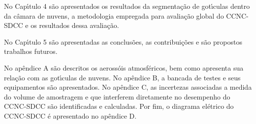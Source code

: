 No Cap\'{\i}tulo 4 s\~{a}o apresentados os resultados da segmenta\c{c}\~{a}o de got\'{\i}culas dentro da c\^{a}mara de nuvens, a metodologia empregada para avalia\c{c}\~{a}o global do CCNC-SDCC e os resultados dessa avalia\c{c}\~{a}o.

No Cap\'{\i}tulo 5 s\~{a}o apresentadas as conclus\~{o}es, as contribui\c{c}\~{o}es e s\~{a}o propostos trabalhos futuros.

No ap\^{e}ndice A s\~{a}o descritos os aeross\'{o}is atmosf\'{e}ricos, bem como apresenta sua rela\c{c}\~{a}o com as got\'{\i}culas de nuvens. No ap\^{e}ndice B, a bancada de testes e seus equipamentos s\~{a}o apresentados.  No ap\^{e}ndice C, as incertezas associadas a medida do volume de amostragem e que  interferem diretamente no desempenho do CCNC-SDCC s\~{a}o identificadas e calculadas. Por fim,  o diagrama el\'{e}trico do CCNC-SDCC \'{e} apresentado no ap\^{e}ndice D.


